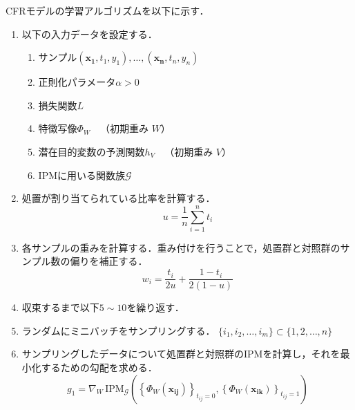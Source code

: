 \documentclass[dvipdfmx]{jreport}
\begin{document}
CFRモデルの学習アルゴリズムを以下に示す．
\begin{tcolorbox}[title=\textbf{CFRアルゴリズム}]
    \begin{enumerate}
        \item 以下の入力データを設定する．
        \begin{enumerate}
            \item サンプル\(
                (\boldsymbol{x_1}, t_1, y_1), \dots, (\boldsymbol{x_n}, t_n, y_n)
                \)
                \item 正則化パラメータ\(
                \alpha > 0
                \)
                \item 損失関数\(
                L
                \)
                \item 特徴写像\(
                \Phi_W \quad \text{（初期重み } W \text{）}
                \)
                \item 潜在目的変数の予測関数\(
                h_V \quad \text{（初期重み } V \text{）}
                \)
                \item IPMに用いる関数族\(
                \mathcal{G}
                \)
        \end{enumerate}
        \item 処置が割り当てられている比率を計算する．
        \begin{equation}
        u = \frac{1}{n} \sum_{i=1}^{n} t_i
        \end{equation}
        \item 各サンプルの重みを計算する．重み付けを行うことで，処置群と対照群のサンプル数の偏りを補正する．
        \begin{equation}
            w_i = \frac{t_i}{2u} + \frac{1 - t_i}{2(1 - u)}
            \end{equation}
        \item 収束するまで以下$5 \sim 10$を繰り返す．
        \item ランダムにミニバッチをサンプリングする． $\{i_1, i_2, \dots, i_m\} \subset \{1, 2, \dots, n\}$
        \item サンプリングしたデータについて処置群と対照群のIPMを計算し，それを最小化するための勾配を求める．
        \begin{equation}
            g_1 = \nabla_W \, \mathrm{IPM}_{\mathcal{G}} \left( \left\{ \Phi_W(\boldsymbol{x_{ij}}) \right\}_{t_{ij}=0}, \left\{ \Phi_W(\boldsymbol{x_{ik}}) \right\}_{t_{ij}=1} \right)

\end{equation}
\end{enumerate}
\end{tcolorbox}
\end{document}
